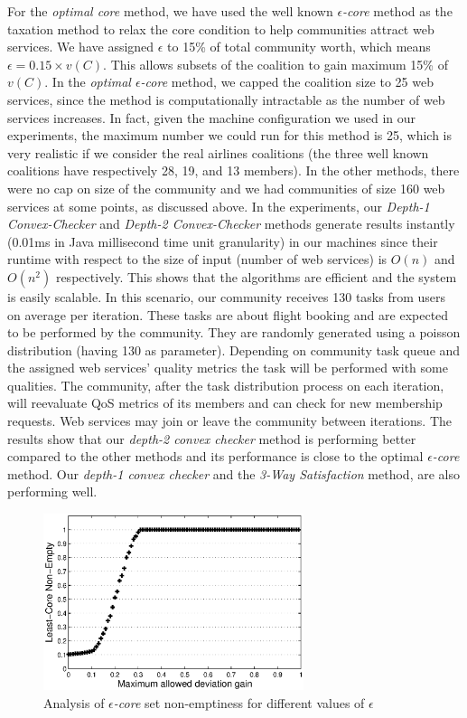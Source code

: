 \documentclass[10pt,journal,cspaper,compsoc]{IEEEtran}
\begin{document}
For the \emph{optimal core} method, we have used the well known
\emph{$\epsilon$-core} method as the taxation method to relax the
core condition to help communities attract web services. We have
assigned $\epsilon$ to 15\% of total community worth, which means
$\epsilon = 0.15 \times v(C)$. This allows subsets of the
coalition to gain maximum 15\% of $v(C)$. In the \emph{optimal
$\epsilon$-core} method, we capped the coalition size to 25 web
services, since the method is computationally intractable as the
number of web services increases. In fact, given the machine
configuration we used in our experiments, the maximum number we
could run for this method is 25, which is very realistic if we
consider the real airlines coalitions (the three well known
coalitions have respectively 28, 19, and 13 members). In the other
methods, there were no cap on size of the community and we had
communities of size 160 web services at some points, as discussed
above. In the experiments, our \emph{Depth-1 Convex-Checker} and
\emph{Depth-2 Convex-Checker} methods generate results instantly
(0.01ms in Java millisecond time unit granularity) in our machines
since their runtime with respect to the size of input (number of
web services) is $O(n)$ and $O(n^2)$ respectively. This shows that
the algorithms are efficient and the system is easily scalable. In
this scenario, our community receives 130 tasks from users on
average per iteration. These tasks are about flight booking and
are expected to be performed by the community. They are randomly
generated using a poisson distribution (having 130 as parameter).
Depending on community task queue and the assigned web services'
quality metrics the task will be performed with some qualities.
The community, after the task distribution process on each
iteration, will reevaluate QoS metrics of its members and can
check for new membership requests. Web services may join or leave
the community between iterations. The results show that our
\emph{depth-2 convex checker} method is performing better compared
to the other methods and its performance is close to the optimal
\emph{$\epsilon$-core} method. Our \emph{depth-1 convex checker}
and the \emph{3-Way Satisfaction} method, are also performing
well.


\begin{figure}%
\centering
\includegraphics[width=3in]{least_core.eps}
\caption{Analysis of \emph{$\epsilon$-core} set non-emptiness for
different values of $\epsilon$} \label{f_leastcore}
\end{figure}
\end{document}
